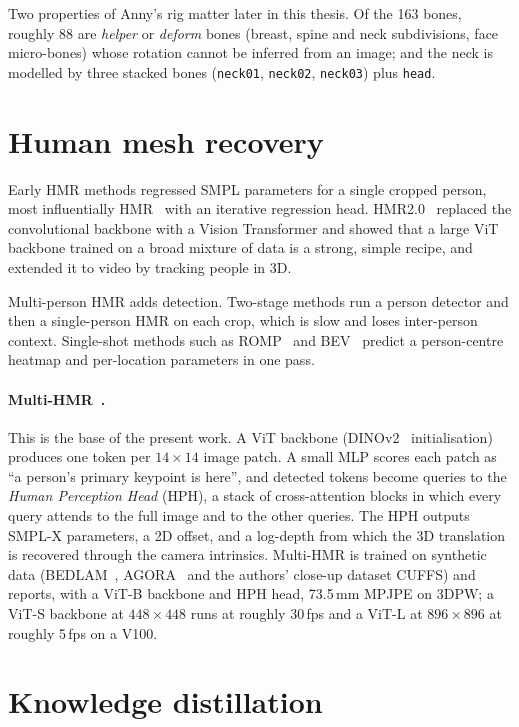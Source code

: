 Two properties of Anny's rig matter later in this thesis. Of the 163 bones,
roughly 88 are \emph{helper} or \emph{deform} bones (breast, spine and neck
subdivisions, face micro-bones) whose rotation cannot be inferred from an
image; and the neck is modelled by three stacked bones
(\texttt{neck01}, \texttt{neck02}, \texttt{neck03}) plus \texttt{head}.

\section{Human mesh recovery}

Early HMR methods regressed SMPL parameters for a single cropped person, most
influentially HMR~\cite{kanazawa2018hmr} with an iterative regression head.
HMR2.0~\cite{goel2023humans4d} replaced the convolutional backbone with a
Vision Transformer and showed that a large ViT backbone trained on a broad
mixture of data is a strong, simple recipe, and extended it to video by tracking
people in 3D.

Multi-person HMR adds detection. Two-stage methods run a person detector and
then a single-person HMR on each crop, which is slow and loses inter-person
context. Single-shot methods such as ROMP~\cite{sun2021romp} and
BEV~\cite{sun2022bev} predict a person-centre heatmap and per-location
parameters in one pass.

\paragraph{Multi-HMR~\cite{baradel2024multihmr}.} This is the base of the
present work. A ViT backbone (DINOv2~\cite{oquab2023dinov2} initialisation)
produces one token per $14{\times}14$ image patch. A small MLP scores each
patch as ``a person's primary keypoint is here'', and detected tokens become
queries to the \emph{Human Perception Head} (HPH), a stack of cross-attention
blocks in which every query attends to the full image and to the other queries.
The HPH outputs SMPL-X parameters, a 2D offset, and a log-depth from which the
3D translation is recovered through the camera intrinsics. Multi-HMR is trained
on synthetic data (BEDLAM~\cite{black2023bedlam}, AGORA~\cite{patel2021agora}
and the authors' close-up dataset CUFFS) and reports, with a ViT-B backbone and
HPH head, 73.5\,mm MPJPE on 3DPW; a ViT-S backbone at $448{\times}448$ runs at
roughly 30\,fps and a ViT-L at $896{\times}896$ at roughly 5\,fps on a V100.

\section{Knowledge distillation}

